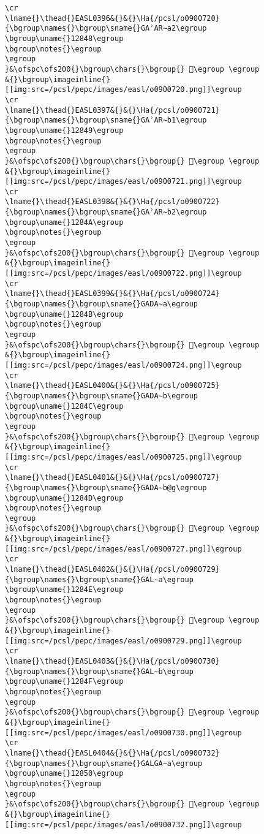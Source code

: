 \begin{verbatim}
\cr
\lname{}\thead{}EASL0396&{}&{}\Ha{/pcsl/o0900720}{\bgroup\names{}\bgroup\sname{}GAʾAR∼a2\egroup
\bgroup\uname{}12848\egroup
\bgroup\notes{}\egroup
\egroup
}&\ofspc\ofs200{}\bgroup\chars{}\bgroup{} 𒡈\egroup \egroup
&{}\bgroup\imageinline{}[[img:src=/pcsl/pepc/images/easl/o0900720.png]]\egroup
\cr
\lname{}\thead{}EASL0397&{}&{}\Ha{/pcsl/o0900721}{\bgroup\names{}\bgroup\sname{}GAʾAR∼b1\egroup
\bgroup\uname{}12849\egroup
\bgroup\notes{}\egroup
\egroup
}&\ofspc\ofs200{}\bgroup\chars{}\bgroup{} 𒡉\egroup \egroup
&{}\bgroup\imageinline{}[[img:src=/pcsl/pepc/images/easl/o0900721.png]]\egroup
\cr
\lname{}\thead{}EASL0398&{}&{}\Ha{/pcsl/o0900722}{\bgroup\names{}\bgroup\sname{}GAʾAR∼b2\egroup
\bgroup\uname{}1284A\egroup
\bgroup\notes{}\egroup
\egroup
}&\ofspc\ofs200{}\bgroup\chars{}\bgroup{} 𒡊\egroup \egroup
&{}\bgroup\imageinline{}[[img:src=/pcsl/pepc/images/easl/o0900722.png]]\egroup
\cr
\lname{}\thead{}EASL0399&{}&{}\Ha{/pcsl/o0900724}{\bgroup\names{}\bgroup\sname{}GADA∼a\egroup
\bgroup\uname{}1284B\egroup
\bgroup\notes{}\egroup
\egroup
}&\ofspc\ofs200{}\bgroup\chars{}\bgroup{} 𒡋\egroup \egroup
&{}\bgroup\imageinline{}[[img:src=/pcsl/pepc/images/easl/o0900724.png]]\egroup
\cr
\lname{}\thead{}EASL0400&{}&{}\Ha{/pcsl/o0900725}{\bgroup\names{}\bgroup\sname{}GADA∼b\egroup
\bgroup\uname{}1284C\egroup
\bgroup\notes{}\egroup
\egroup
}&\ofspc\ofs200{}\bgroup\chars{}\bgroup{} 𒡌\egroup \egroup
&{}\bgroup\imageinline{}[[img:src=/pcsl/pepc/images/easl/o0900725.png]]\egroup
\cr
\lname{}\thead{}EASL0401&{}&{}\Ha{/pcsl/o0900727}{\bgroup\names{}\bgroup\sname{}GADA∼b@g\egroup
\bgroup\uname{}1284D\egroup
\bgroup\notes{}\egroup
\egroup
}&\ofspc\ofs200{}\bgroup\chars{}\bgroup{} 𒡍\egroup \egroup
&{}\bgroup\imageinline{}[[img:src=/pcsl/pepc/images/easl/o0900727.png]]\egroup
\cr
\lname{}\thead{}EASL0402&{}&{}\Ha{/pcsl/o0900729}{\bgroup\names{}\bgroup\sname{}GAL∼a\egroup
\bgroup\uname{}1284E\egroup
\bgroup\notes{}\egroup
\egroup
}&\ofspc\ofs200{}\bgroup\chars{}\bgroup{} 𒡎\egroup \egroup
&{}\bgroup\imageinline{}[[img:src=/pcsl/pepc/images/easl/o0900729.png]]\egroup
\cr
\lname{}\thead{}EASL0403&{}&{}\Ha{/pcsl/o0900730}{\bgroup\names{}\bgroup\sname{}GAL∼b\egroup
\bgroup\uname{}1284F\egroup
\bgroup\notes{}\egroup
\egroup
}&\ofspc\ofs200{}\bgroup\chars{}\bgroup{} 𒡏\egroup \egroup
&{}\bgroup\imageinline{}[[img:src=/pcsl/pepc/images/easl/o0900730.png]]\egroup
\cr
\lname{}\thead{}EASL0404&{}&{}\Ha{/pcsl/o0900732}{\bgroup\names{}\bgroup\sname{}GALGA∼a\egroup
\bgroup\uname{}12850\egroup
\bgroup\notes{}\egroup
\egroup
}&\ofspc\ofs200{}\bgroup\chars{}\bgroup{} 𒡐\egroup \egroup
&{}\bgroup\imageinline{}[[img:src=/pcsl/pepc/images/easl/o0900732.png]]\egroup

\end{verbatim}

